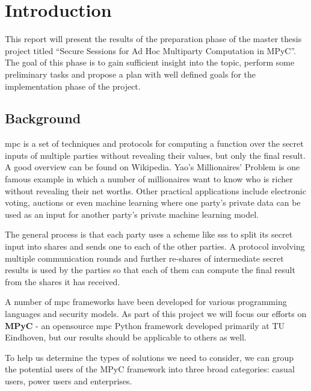\hypertarget{introduction}{%
\chapter{Introduction}\label{introduction}}

This report will present the results of the preparation phase of the
master thesis project titled ``Secure Sessions for Ad Hoc Multiparty
Computation in MPyC''. The goal of this phase is to gain sufficient
insight into the topic, perform some preliminary tasks and propose a
plan with well defined goals for the implementation phase of the
project.

\hypertarget{background}{%
\section{Background}\label{background}}

\gls{mpc} is a set of techniques and protocols for computing a function
over the secret inputs of multiple parties without revealing their
values, but only the final result. A good overview can be found on
Wikipedia\autocite{wikiMPC}. Yao's Millionaires'
Problem\autocite{yaoProtocolsSecureComputations1982} is one famous
example in which a number of millionaires want to know who is richer
without revealing their net worths. Other practical
applications\autocite{laudApplicationsSecureMultiparty2015} include
electronic voting, auctions or even machine
learning\autocite{knottCrypTenSecureMultiParty2022} where one party's
private data can be used as an input for another party's private machine
learning model.

The general process is that each party uses a scheme like \gls{sss}
\autocite{shamirHowShareSecret1979} to split its secret input into
shares and sends one to each of the other parties. A protocol involving
multiple communication rounds and further re-shares of intermediate
secret results is used by the parties so that each of them can compute
the final result from the shares it has received.

A number of \gls{mpc} frameworks have been developed for various
programming languages and security models. As part of this project we
will focus our efforts on \textbf{MPyC}\autocite{mpycHome,mpycSource} -
an opensource \gls{mpc} Python framework developed primarily at TU
Eindhoven, but our results should be applicable to others as well.

To help us determine the types of solutions we need to consider, we can
group the potential users of the MPyC framework into three broad
categories: casual users, power users and enterprises.

